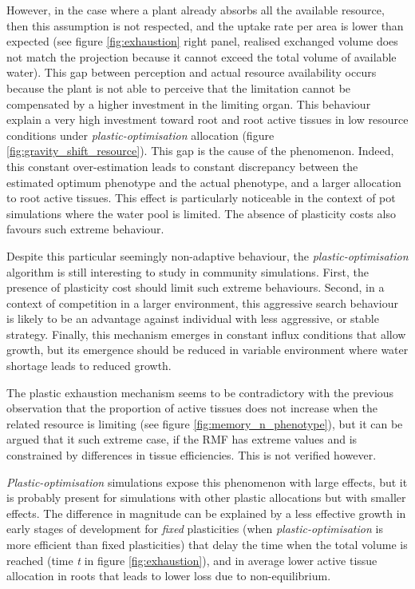 However, in the case where a plant already absorbs all the available resource, then this assumption is not respected, and the uptake rate per area is lower than expected (see figure \ref{fig:exhaustion} right panel, realised exchanged volume does not match the projection because it cannot exceed the total volume of available water). This gap between perception and actual resource availability occurs because the plant is not able to perceive that the limitation cannot be compensated by a higher investment in the limiting organ. This behaviour explain a very high investment toward root and root active tissues in low resource conditions under \textit{plastic-optimisation} allocation (figure \ref{fig:gravity_shift_resource}). This gap is the cause of the  phenomenon. Indeed, this constant over-estimation leads to constant discrepancy between the estimated optimum phenotype and the actual phenotype, and a larger allocation to root active tissues. This effect is particularly noticeable in the context of pot simulations where the water pool is limited. The absence of plasticity costs also favours such extreme behaviour. 

Despite this particular seemingly non-adaptive behaviour, the \textit{plastic-optimisation} algorithm is still interesting to study in community simulations. First, the presence of plasticity cost should limit such extreme behaviours. Second, in a context of competition in a larger environment, this aggressive search behaviour is likely to be an advantage against individual with less aggressive, or stable strategy. Finally, this mechanism emerges in constant influx conditions that allow growth, but its emergence should be reduced in variable environment where water shortage leads to reduced growth.

The plastic exhaustion mechanism seems to be contradictory with the previous observation that the proportion of active tissues does not increase when the related resource is limiting (see figure \ref{fig:memory_n_phenotype}), but it can be argued that it such extreme case, if the RMF has extreme values and is constrained by differences in tissue efficiencies. This is not verified however.

\textit{Plastic-optimisation} simulations expose this phenomenon with large effects, but it is probably present for simulations with other plastic allocations but with smaller effects. The difference in magnitude can be explained by a less effective growth in early stages of development for \textit{fixed} plasticities (when \textit{plastic-optimisation} is more efficient than fixed plasticities) that delay the time when the total volume is reached (time \textit{t} in figure \ref{fig:exhaustion}), and in average lower active tissue allocation in roots that leads to lower loss due to non-equilibrium.

